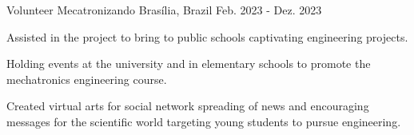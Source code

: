 

\begin{cventries}

  \cventry
    {Volunteer} %
    {Mecatronizando} %
    {Brasília, Brazil} %
    {Feb. 2023 - Dez. 2023} %
    {
      \begin{cvitems} %
        \item {Assisted in the project to bring to public schools captivating engineering projects.}
        \item {Holding events at the university and in elementary schools to promote the mechatronics engineering course.}
        \item {Created virtual arts for social network spreading of news and encouraging messages for the scientific world targeting young students to pursue engineering.}
      \end{cvitems}
    }

\end{cventries}
